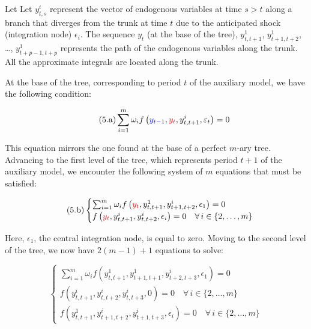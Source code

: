 \documentclass[a4paper,11pt]{amsart}
\begin{document}
Let Let $y_{t,s}^i$ represent the vector of endogenous variables at
time $s>t$ along a branch that diverges from the trunk at time $t$ due
to the anticipated shock (integration node) $\epsilon_i$. The
sequence $y_t$ (at the base of the tree), $y_{t,t+1}^1$, $y_{t+1,t+2}^1$,
\dots, $y_{t+p-1,t+p}^1$ represents the path of the endogenous
variables along the trunk. All the approximate integrals are located along the trunk.\newline

At the base of the tree, corresponding to period \(t\) of the auxiliary model, we have the following condition:

\begin{equation}
   \label{sep:sparse:0}\tag{5.a}
   \sum_{i=1}^m\omega_i f\left( {\color{blue}y_{t-1}}, {\color{red}y_t}, y_{t, t+1}^i, \varepsilon_t \right) = 0
\end{equation}

This equation mirrors the one found at the base of a perfect \(m\)-ary
tree. Advancing to the first level of the tree, which represents
period \( t+1 \) of the auxiliary model, we encounter the
following system of \( m \) equations that must be satisfied:

\begin{equation}
   \label{sep:sparse:1}\tag{5.b}
   \begin{cases}
      \sum_{i=1}^m\omega_i f\left( {\color{red}y_t}, y_{t,t+1}^1, y_{t+1, t+2}^i, \epsilon_1 \right) = 0 \\
      f\left({\color{red}y_t}, y_{t,t+1}^i, y_{t,t+2}^i, \epsilon_i\right) = 0\quad \forall\, i\in\{2,\ldots,m\}
   \end{cases}
\end{equation}

Here, \(\epsilon_1\), the central integration node, is equal to
zero. Moving to the second level of the tree, we now have \(2(m-1)+1\)
equations to solve:

\begin{equation}
   \label{sep:sparse:2}\tag{5.c}
   \begin{cases}
      \sum_{i=1}^m\omega_i f\left( y_{t,t+1}^1, y_{t+1,t+1}^1, y_{t+2, t+3}^i, \epsilon_1 \right) = 0 \\
      f\left(y_{t,t+1}^i, y_{t,t+2}^i, y_{t,t+3}^i, 0\right) = 0\quad \forall\, i\in\{2,\ldots,m\}    \\
      f\left(y_{t,t+1}^1, y_{t+1,t+2}^i, y_{t+1, t+3}^i, \epsilon_i\right) = 0\quad \forall\, i\in\{2,\ldots,m\}
   \end{cases}
\end{equation}
\end{document}
